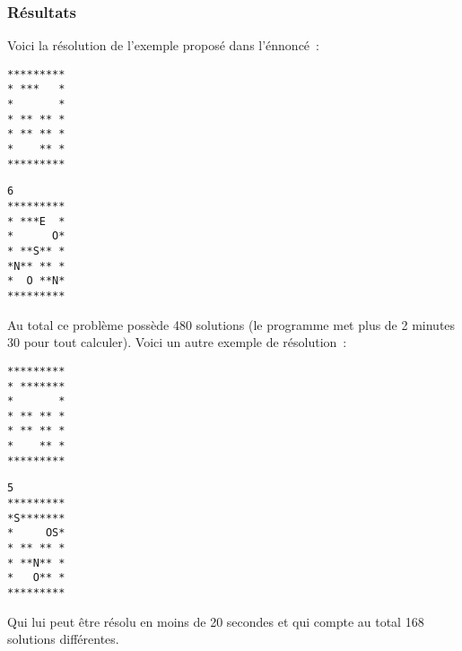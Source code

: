 \documentclass[a4paper,11pt]{article}
\begin{document}
        \subsubsection{Résultats}
            Voici la résolution de l'exemple proposé dans l'énnoncé~:\\
            \begin{minipage}{.4\linewidth}
              \centering
              \begin{verbatim}
*********
* ***   *
*       *
* ** ** *
* ** ** *
*    ** *
*********
              \end{verbatim}
            \end{minipage}
            \begin{minipage}{.4\linewidth}
              \centering
              \begin{verbatim}
6
*********
* ***E  *
*      O*
* **S** *
*N** ** *
*  O **N*
*********
              \end{verbatim}
            \end{minipage}
             
            Au total ce problème possède 480 solutions (le programme met plus de 2 minutes 30 pour tout calculer).  Voici un autre exemple de résolution~:\\
            \begin{minipage}{.4\linewidth}
              \centering
              \begin{verbatim}
*********
* *******
*       *
* ** ** *
* ** ** *
*    ** *
*********
              \end{verbatim}
            \end{minipage}
            \begin{minipage}{.4\linewidth}
              \centering
              \begin{verbatim}
5
*********
*S*******
*     OS*
* ** ** *
* **N** *
*   O** *
*********
              \end{verbatim}
            \end{minipage}
            
           Qui lui peut être résolu en moins de 20 secondes et qui compte au total  168 solutions différentes.
\end{document}

